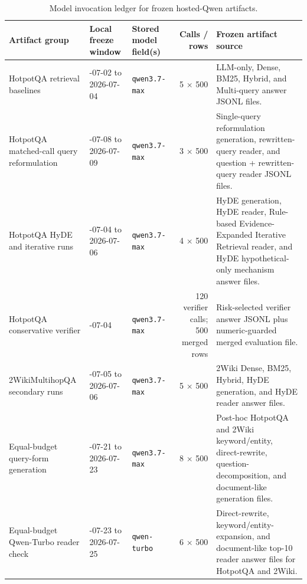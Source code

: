 \begin{table}[t]
\centering
\caption{Model invocation ledger for frozen hosted-Qwen artifacts.}
\label{tab:model_invocation_ledger}
\scriptsize
\begin{threeparttable}
\setlength{\tabcolsep}{3pt}
\begin{tabularx}{\textwidth}{>{\raggedright\arraybackslash}p{}
                            >{\raggedright\arraybackslash}p{}
                            >{\raggedright\arraybackslash}p{}
                            r
                            >{\raggedright\arraybackslash}X}
\toprule
Artifact group & Local freeze window & Stored model field(s) & Calls / rows & Frozen artifact source \\
\midrule
HotpotQA retrieval baselines & 2026-07-02 to 2026-07-04 & \texttt{qwen3.7-max} & 5 $\times$ 500 & LLM-only, Dense, BM25, Hybrid, and Multi-query answer JSONL files. \\
HotpotQA matched-call query reformulation & 2026-07-08 to 2026-07-09 & \texttt{qwen3.7-max} & 3 $\times$ 500 & Single-query reformulation generation, rewritten-query reader, and question + rewritten-query reader JSONL files. \\
HotpotQA HyDE and iterative runs & 2026-07-04 to 2026-07-06 & \texttt{qwen3.7-max} & 4 $\times$ 500 & HyDE generation, HyDE reader, Rule-based Evidence-Expanded Iterative Retrieval reader, and HyDE hypothetical-only mechanism answer files. \\
HotpotQA conservative verifier & 2026-07-04 & \texttt{qwen3.7-max} & 120 verifier calls; 500 merged rows & Risk-selected verifier answer JSONL plus numeric-guarded merged evaluation file. \\
2WikiMultihopQA secondary runs & 2026-07-05 to 2026-07-06 & \texttt{qwen3.7-max} & 5 $\times$ 500 & 2Wiki Dense, BM25, Hybrid, HyDE generation, and HyDE reader answer files. \\
Equal-budget query-form generation & 2026-07-21 to 2026-07-23 & \texttt{qwen3.7-max} & 8 $\times$ 500 & Post-hoc HotpotQA and 2Wiki keyword/entity, direct-rewrite, question-decomposition, and document-like generation files. \\
Equal-budget Qwen-Turbo reader check & 2026-07-23 to 2026-07-25 & \texttt{qwen-turbo} & 6 $\times$ 500 & Direct-rewrite, keyword/entity-expansion, and document-like top-10 reader answer files for HotpotQA and 2Wiki. \\
\bottomrule
\end{tabularx}
\begin{tablenotes}

\end{tablenotes}
\end{threeparttable}
\end{table}
